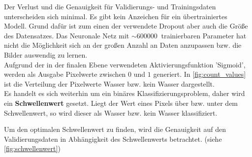 Der Verlust und die Genauigkeit für Validierungs- und Trainingsdaten unterscheiden sich minimal.
Es gibt kein Anzeichen für ein übertrainiertes Modell.
Grund dafür ist zum einen der verwendete Dropout aber auch die Größe des Datensatzes.
Das Neuronale Netz mit $\sim \SI{600000}{}$ trainierbaren Parameter hat nicht die Möglichkeit sich an der großen Anzahl an Daten anzupassen bzw. die Bilder auswendig zu lernen.
\\
Aufgrund der in der finalen Ebene verwendeten Aktivierungsfunktion 'Sigmoid', werden als Ausgabe Pixelwerte zwischen $0$ und $1$ generiert.
In \autoref{fig:count_values} ist die Verteilung der Pixelwerte Wasser bzw. kein Wasser dargestellt.
\\
Es handelt es sich weiterhin um ein binäres Klassifizierungsproblem, daher wird ein \textbf{Schwellenwert} gesetzt.
Liegt der Wert eines Pixels über bzw. unter dem Schwellenwert, so wird dieser als Wasser bzw. kein Wasser klassifiziert.

Um den optimalen Schwellenwert zu finden, wird die Genauigkeit auf den Validierungsdaten in Abhängigkeit des Schwellenwerts betrachtet. (siehe \autoref{fig:schwellenwert})


